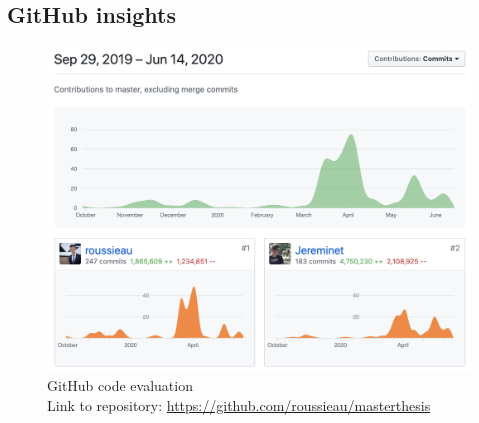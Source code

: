 \begin{appendix}
\chapter{GitHub insights}
    \begin{figure}[!ht]
    \centering
      \includegraphics[width=\linewidth]{Figures/github.png}
       \captionsetup{justification=centering}
      \caption{GitHub code evaluation \\
      Link to repository: \url{https://github.com/roussieau/masterthesis}}
      \label{fig:packers}
    \end{figure}
    
    
\end{appendix}